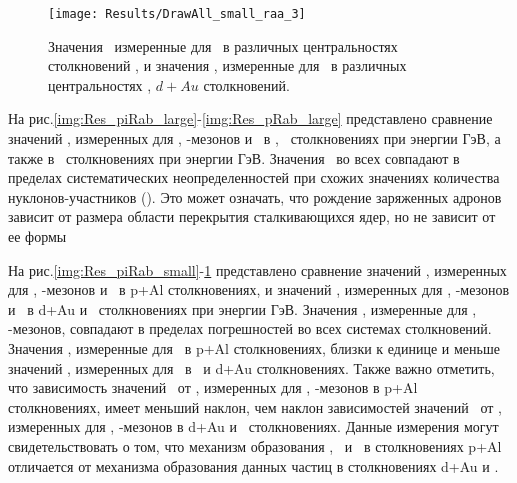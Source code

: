 \begin{figure}[] 
	\centerfloat
	\texttt{[image: Results/DrawAll\_small\_raa\_3]}
	\caption{Значения \rab \ измеренные для \aprot \ в различных центральностях столкновений \pal, и значения \rab, измеренные для \prots \ в различных центральностях \heau, $d+Au$ столкновений.} 
	\label{img:Res_pRab_small}
\end{figure}
На рис.\ref{img:Res_piRab_large}-\ref{img:Res_pRab_large} представлено сравнение значений \rab, измеренных для  \pipm, \Kpm-мезонов и \prots \ в \cuau, \auau \ столкновениях при энергии  ГэВ, а также в \uu \ столкновениях при энергии  ГэВ. Значения \rab \ во всех совпадают в пределах систематических неопределенностей при схожих значениях количества нуклонов-участников (\Npart). Это может означать, что рождение заряженных адронов зависит от размера области перекрытия сталкивающихся ядер, но не зависит от ее формы

На рис.\ref{img:Res_piRab_small}-\ref{img:Res_pRab_small} представлено сравнение значений \rab, измеренных для  \pipm, \Kpm-мезонов и \aprot \ в p+Al столкновениях, и значений \rab, измеренных для \pipm, \Kpm-мезонов и \prots \ в d+Au и \heau \ столкновениях при энергии  ГэВ. Значения \rab, измеренные для \pipm, \Kpm-мезонов, совпадают в пределах погрешностей во всех системах столкновений. Значения \rab, измеренные для \aprot \ в p+Al столкновениях, близки к единице и меньше значений \rab, измеренных для \prots \ в \heau \ и d+Au столкновениях. Также важно отметить, что зависимость значений \rab \ от \pt, измеренных для \pipm, \Kpm-мезонов в p+Al столкновениях, имеет меньший наклон, чем наклон зависимостей значений \rab \ от \pt, измеренных для \pipm, \Kpm-мезонов в d+Au и \heau \ столкновениях. Данные измерения могут свидетельствовать о том, что механизм образования \pipm, \Kpm \ и \aprot \ в столкновениях p+Al отличается от механизма образования данных частиц в столкновениях d+Au и \heau.


